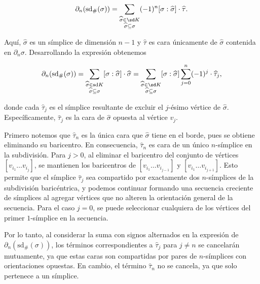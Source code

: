 \begin{equation}
	\label{eq:subdv-borde}
	\partial_n(\text{sd}_\#(\sigma)) = \sum_{\substack{\widehat{\sigma} \in  \sd K \\ \widehat{\sigma} \subseteq \sigma}} (-1)^n [\sigma : \widehat{\sigma}] \cdot \widehat{\tau}.
\end{equation}

Aquí, \( \widehat{\sigma} \) es un símplice de dimensión \( n-1 \) y \( \widehat{\tau} \) es cara únicamente de \( \widehat{\sigma} \) contenida en \( \partial_n\sigma \). Desarrollando la expresión obtenemos

\[
	\partial_n(\text{sd}_\#(\sigma)) = \sum_{\substack{\widehat{\sigma} \in \text{sd} K \\ \widehat{\sigma} \subseteq \sigma}} [\sigma : \widehat{\sigma}] \cdot \widehat{\sigma} = \sum_{\substack{\widehat{\sigma} \in  \sd K \\ \widehat{\sigma} \subseteq \sigma}} [\sigma : \widehat{\sigma}] \sum_{j=0}^n (-1)^j \cdot \widehat{\tau}_j,
\]

donde cada \( \widehat{\tau}_j \) es el símplice resultante de excluir el \( j \)-ésimo vértice de \( \widehat{\sigma} \). Específicamente, \( \widehat{\tau}_j \) es la cara de \( \widehat{\sigma} \) opuesta al vértice \( v_j \).

Primero notemos que  \( \widehat{\tau}_n \) es la única cara que  \( \widehat{\sigma} \) tiene en el borde, pues se obtiene eliminando su baricentro. En consecuencia, \( \widehat{\tau}_n \) es cara de un único \( n \)-símplice en la subdivisión. Para \( j > 0 \), al eliminar el baricentro del conjunto de vértices \( [v_{i_1} \ldots v_{i_j}] \), se mantienen los baricentros de \( [v_{i_1} \ldots v_{i_{j-1}}] \) y \( [v_{i_1} \ldots v_{i_{j+1}}] \). Esto permite que el símplice \( \widehat{\tau}_j \) sea compartido por exactamente dos \( n \)-símplices de la subdivisión baricéntrica, y podemos continuar formando una secuencia creciente de símplices al agregar vértices que no alteren la orientación general de la secuencia. Para el caso \( j = 0 \), se puede seleccionar cualquiera de los vértices del primer $1$-símplice en la secuencia.

Por lo tanto, al considerar la suma con signos alternados en la expresión de \( \partial_n(\text{sd}_\#(\sigma)) \), los términos correspondientes a \( \widehat{\tau}_j \) para \( j \neq n \) se cancelarán mutuamente, ya que estas caras son compartidas por pares de \( n \)-símplices con orientaciones opuestas. En cambio, el término \( \widehat{\tau}_n \) no se cancela, ya que solo pertenece a un símplice.

